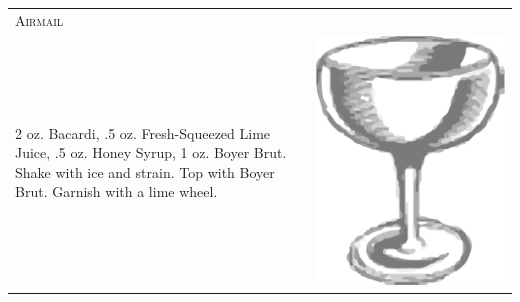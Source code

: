 \documentclass{article}
\begin{document}
\begin{tabular}{p{2in} p{0.5in}}
\multicolumn{2}{p{3in}}{\centering\Huge\textsc{Airmail}} \\ 
  \vspace{-0.1in}2 oz. Bacardi, .5 oz. Fresh-Squeezed Lime Juice, .5 oz. Honey Syrup, 1 oz. Boyer Brut. Shake with ice and strain. Top with Boyer Brut. Garnish with a lime wheel. &
  \vspace{-0.1in} \includegraphics{egg_coupe.png}
\end{tabular}
\end{document}
